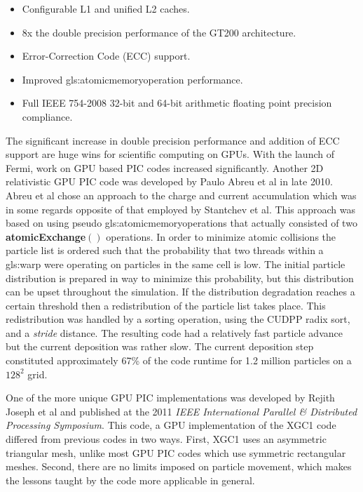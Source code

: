 \begin{itemize}
\singlespacing
\item Configurable L1 and unified L2 caches.
\item 8x the double precision performance of the GT200 architecture. 
\item Error-Correction Code (ECC) support. 
\item Improved \gls{gls:atomicmemoryoperation} performance.
\item Full IEEE 754-2008 32-bit and 64-bit arithmetic floating point precision compliance. 
\end{itemize}

The significant increase in double precision performance and addition of ECC support are huge wins for scientific computing on GPUs. With the launch of Fermi, work on GPU based PIC codes increased significantly. Another 2D relativistic GPU PIC code was developed by Paulo Abreu et al in late 2010.\cite{Abreu2011} Abreu et al chose an approach to the charge and current accumulation which was in some regards opposite of that employed by Stantchev et al. This approach was based on using pseudo \glspl{gls:atomicmemoryoperation} that actually consisted of two \textbf{atomicExchange}$()$ operations. In order to minimize atomic collisions the particle list is ordered such that the probability that two threads within a \gls{gls:warp} were operating on particles in the same cell is low. The initial particle distribution is prepared in way to minimize this probability, but this distribution can be upset throughout the simulation. If the distribution degradation reaches a certain threshold then a redistribution of the particle list takes place. This redistribution was handled by a sorting operation, using the CUDPP radix sort, and a \emph{stride} distance. The resulting code had a relatively fast particle advance but the current deposition was rather slow. The current deposition step constituted approximately 67\% of the code runtime for 1.2 million particles on a $128^2$ grid.

One of the more unique GPU PIC implementations was developed by Rejith Joseph et al and published at the 2011 \emph{IEEE International Parallel \& Distributed Processing Symposium}.\cite{Joseph2011} This code, a GPU implementation of the XGC1 code differed from previous codes in two ways. First, XGC1 uses an asymmetric triangular mesh, unlike most GPU PIC codes which use symmetric rectangular meshes. Second, there are no limits imposed on particle movement, which makes the lessons taught by the code more applicable in general.

